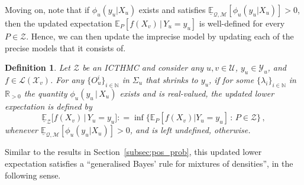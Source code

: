 \documentclass[3p]{elsarticle}
\newtheorem{definition}{Definition}
\newcommand{\nats}{\mathbb{N}}
\newcommand{\reals}{\mathbb{R}}
\newcommand{\realspos}{\reals_{>0}}
\newcommand{\states}{\mathcal{X}}
\newcommand{\observs}{\mathcal{Y}}
\newcommand{\lexp}{\underline{\mathbb{E}}_{\rateset,\mathcal{M}}}
\newcommand{\gambles}{\mathcal{L}}
\newcommand{\rateset}{\mathcal{Q}}
\newcommand{\coloneqq}{:\!=}
\begin{document}


Moving on, note that if $\phi_u(y_u\vert X_u)$ exists and satisfies $\lexp[\phi_u(y_u\vert X_u)]>0$, then the updated expectation $\mathbb{E}_P[f(X_v)\,\vert\,Y_u=y_u]$ is well-defined for every $P\in\mathcal{Z}$. Hence, we can then update the imprecise model by updating each of the precise models that it consists of.
\begin{definition}\label{def:reg_ext_densities}
Let $\mathcal{Z}$ be an ICTHMC and consider any $u,v\in\mathcal{U}$, $y_u\in\observs_u$, and $f\in\gambles(\states_v)$. For any $\{O_u^i\}_{i\in\nats}$ in $\Sigma_u$ that shrinks to $y_u$, if for some $\{\lambda_i\}_{i\in\nats}$ in $\realspos$ the quantity $\phi_u(y_u\,\vert\,X_u)$ exists and is real-valued, the updated lower expectation is defined by
\begin{equation*}
\underline{\mathbb{E}}_{\mathcal{Z}}\bigl[f(X_v)\,\vert\,Y_u = y_u\bigr] \coloneqq \inf\{\mathbb{E}_P[f(X_v)\vert Y_u=y_u]\,:\,P\in\mathcal{Z}\}\,,
\end{equation*}
whenever $\lexp[\phi_u(y_u\vert X_u)] >0$, and is left undefined, otherwise.
\end{definition}

Similar to the results in Section~\ref{subsec:pos_prob}, this updated lower expectation satisfies a ``generalised Bayes' rule for mixtures of densities'', in the following sense.
\end{document}
